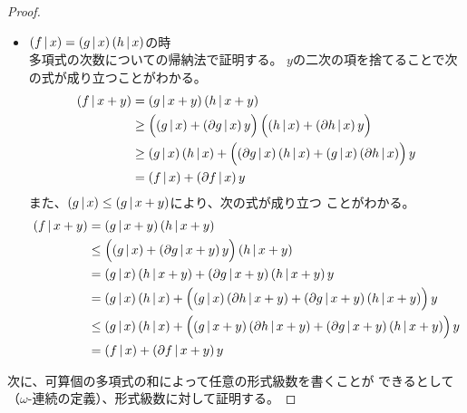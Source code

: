 {\begin{proof}
\begin{itemize}
\begin{equation*}
\begin{split}
				&\le \plr{g\bou x} + \plr{\partial g\bou x + y}y
					+ \plr{h\bou x} + \plr{\partial h\bou x + y}y \\
				&= \plr{f\bou x} + \plr{\partial f\bou x + y}y \\
			\end{split}\end{equation*}
			\item $\mathinner{({f{\,|\,}x})}=\mathinner{({g{\,|\,}x})}\mathinner{({h{\,|\,}x})}$の時 \\
			多項式の次数についての帰納法で証明する。
			$y$の二次の項を捨てることで次の式が成り立つことがわかる。
			\begin{equation*}\begin{split}
				\mathinner{({f{\,|\,}x + y})} &= \mathinner{({g{\,|\,}x + y})}\mathinner{({h{\,|\,}x + y})} \\
				&\ge \mathinner{\Bigl({\mathinner{({g{\,|\,}x})} + \mathinner{({\partial g{\,|\,}x})}y}\Bigr)}
					\mathinner{\Bigl({\mathinner{({h{\,|\,}x})} + \mathinner{({\partial h{\,|\,}x})}y}\Bigr)} \\
				&\ge \mathinner{({g{\,|\,}x})}\mathinner{({h{\,|\,}x})}
					+ \mathinner{\Bigl({\mathinner{({\partial g{\,|\,}x})}\mathinner{({h{\,|\,}x})} 
					+ \mathinner{({g{\,|\,}x})}\mathinner{({\partial h{\,|\,}x})}}\Bigr)}y \\
				&= \mathinner{({f{\,|\,}x})} + \mathinner{({\partial f{\,|\,}x})}y
			\end{split}\end{equation*}
			また、$\mathinner{({g{\,|\,}x})}\le\mathinner{({g{\,|\,}x + y})}$により、次の式が成り立つ
			ことがわかる。
			\begin{equation*}\begin{split}
				\mathinner{({f{\,|\,}x + y})} &= \mathinner{({g{\,|\,}x + y})}\mathinner{({h{\,|\,}x + y})} \\
				&\le \mathinner{\Bigl({\mathinner{({g{\,|\,}x})} + \mathinner{({\partial g{\,|\,}x + y})}y}\Bigr)}
					\mathinner{({h{\,|\,}x + y})} \\
				&= \mathinner{({g{\,|\,}x})}\mathinner{({h{\,|\,}x + y})} 
					+ \mathinner{({\partial g{\,|\,}x + y})}\mathinner{({h{\,|\,}x + y})}y \\
				&= \mathinner{({g{\,|\,}x})}\mathinner{({h{\,|\,}x})} + \mathinner{\Bigl({
					\mathinner{({g{\,|\,}x})}\mathinner{({\partial h{\,|\,}x + y})}
					+ \mathinner{({\partial g{\,|\,}x + y})}\mathinner{({h{\,|\,}x + y})}}\Bigr)}y \\
				&\le \mathinner{({g{\,|\,}x})}\mathinner{({h{\,|\,}x})} + \mathinner{\Bigl({
					\mathinner{({g{\,|\,}x + y})}\mathinner{({\partial h{\,|\,}x + y})}
					+ \mathinner{({\partial g{\,|\,}x + y})}\mathinner{({h{\,|\,}x + y})}}\Bigr)}y \\
				&= \mathinner{({f{\,|\,}x})} + \mathinner{({\partial f{\,|\,}x + y})}y
			\end{split}\end{equation*}
		\end{itemize} %
		次に、可算個の多項式の和によって任意の形式級数を書くことが
		できるとして（$\omega$-連続の定義）、形式級数に対して証明する。
	\end{proof} %

}
